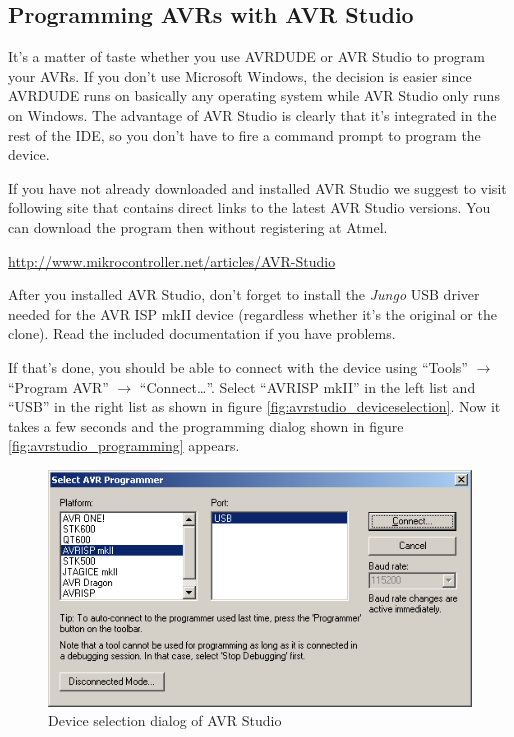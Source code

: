 \documentclass[bibtotoc,UKenglish,halfparskip,oneside,DIV12]{scrreprt}
\begin{document}
\subsection{Programming AVRs with AVR Studio}

It's a matter of taste whether you use AVRDUDE or AVR Studio to program your AVRs. If you don't use
Microsoft Windows, the decision is easier since AVRDUDE runs on basically any operating system while
AVR Studio only runs on Windows. The advantage of AVR Studio is clearly that it's integrated in the
rest of the IDE, so you don't have to fire a command prompt to program the device.

If you have not already downloaded and installed AVR Studio we suggest to visit following site that
contains direct links to the latest AVR Studio versions. You can download the program then without
registering at Atmel.

 \url{http://www.mikrocontroller.net/articles/AVR-Studio}

After you installed AVR Studio, don't forget to install the \emph{Jungo} USB driver needed for the
AVR ISP mkII device (regardless whether it's the original or the clone). Read the included
documentation if you have problems.

If that's done, you should be able to connect with the device using ``Tools'' $\rightarrow$
``Program AVR'' $\rightarrow$ ``Connect\ldots''. Select ``AVRISP mkII'' in the left list and ``USB''
in the right list as shown in figure \vref{fig:avrstudio_deviceselection}.  Now it takes a few
seconds and the programming dialog shown in figure \vref{fig:avrstudio_programming} appears.

\begin{figure}[p]
  \centering
  \includegraphics[scale=0.6]{images/avrstudio_01.png}
  \caption{Device selection dialog of AVR Studio}
  \label{fig:avrstudio_deviceselection}
\end{figure}
\end{document}
